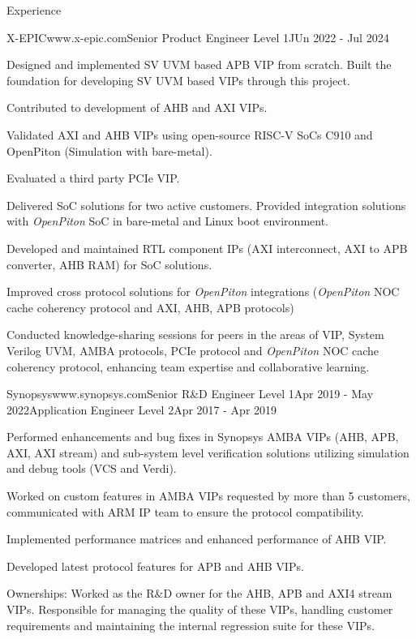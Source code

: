 \documentclass[
11pt, %
]{./assets/resume} %
\begin{document}
\begin{rSection}{Experience}
	\begin{rSubsectionX}{X-EPIC}{www.x-epic.com}{Senior Product Engineer Level 1}{JUn 2022 - Jul 2024}
		\item Designed and implemented SV UVM based APB VIP from scratch. Built the foundation for developing SV UVM based VIPs through this project.
		\item Contributed to development of AHB and AXI VIPs.
		\item Validated AXI and AHB VIPs using open-source RISC-V SoCs C910 and OpenPiton (Simulation with bare-metal).
		\item Evaluated a third party PCIe VIP.
		\item Delivered SoC solutions for two active customers. Provided integration solutions with \textit{OpenPiton} SoC in bare-metal and Linux boot environment.
		\item Developed and maintained RTL component IPs (AXI interconnect, AXI to APB converter, AHB RAM) for SoC solutions.
		\item Improved cross protocol solutions for \textit{OpenPiton} integrations (\textit{OpenPiton} NOC cache coherency protocol and AXI, AHB, APB protocols)
		\item Conducted knowledge-sharing sessions for peers in the areas of VIP, System Verilog UVM, AMBA protocols, PCIe protocol and \textit{OpenPiton} NOC cache coherency protocol, enhancing team expertise and collaborative learning.
	\end{rSubsectionX}
	\begin{rSubsectionM}{Synopsys}{www.synopsys.com}{Senior R\&D Engineer Level 1}{Apr 2019 - May 2022}{Application Engineer Level 2}{Apr 2017 - Apr 2019}{}{}
		\item Performed enhancements and bug fixes in Synopsys AMBA VIPs (AHB, APB, AXI, AXI stream) and sub-system level verification solutions utilizing simulation and debug tools (VCS and Verdi).
		\item Worked on custom features in AMBA VIPs requested by more than 5 customers, communicated with ARM IP team to ensure the protocol compatibility.
		\item Implemented performance matrices and enhanced performance of AHB VIP.
		\item Developed latest protocol features for APB and AHB VIPs.
		\item Ownerships: Worked as the R\&D owner for the AHB, APB and AXI4 stream VIPs. Responsible for managing the quality of these VIPs, handling customer requirements and maintaining the internal regression suite for these VIPs.

\end{rSubsectionM}
\end{rSection}
\end{document}
